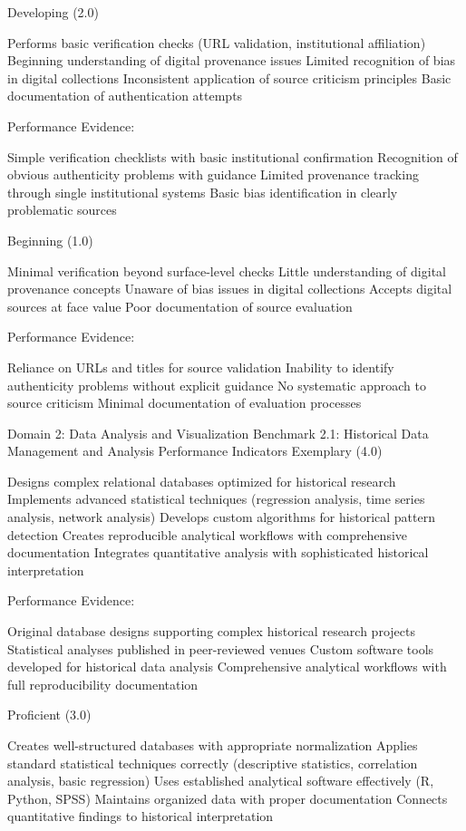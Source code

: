 \begin{appendices}
Developing (2.0)

Performs basic verification checks (URL validation, institutional affiliation)
Beginning understanding of digital provenance issues
Limited recognition of bias in digital collections
Inconsistent application of source criticism principles
Basic documentation of authentication attempts

Performance Evidence:

Simple verification checklists with basic institutional confirmation
Recognition of obvious authenticity problems with guidance
Limited provenance tracking through single institutional systems
Basic bias identification in clearly problematic sources

Beginning (1.0)

Minimal verification beyond surface-level checks
Little understanding of digital provenance concepts
Unaware of bias issues in digital collections
Accepts digital sources at face value
Poor documentation of source evaluation

Performance Evidence:

Reliance on URLs and titles for source validation
Inability to identify authenticity problems without explicit guidance
No systematic approach to source criticism
Minimal documentation of evaluation processes


Domain 2: Data Analysis and Visualization
Benchmark 2.1: Historical Data Management and Analysis
Performance Indicators
Exemplary (4.0)

Designs complex relational databases optimized for historical research
Implements advanced statistical techniques (regression analysis, time series analysis, network analysis)
Develops custom algorithms for historical pattern detection
Creates reproducible analytical workflows with comprehensive documentation
Integrates quantitative analysis with sophisticated historical interpretation

Performance Evidence:

Original database designs supporting complex historical research projects
Statistical analyses published in peer-reviewed venues
Custom software tools developed for historical data analysis
Comprehensive analytical workflows with full reproducibility documentation

Proficient (3.0)

Creates well-structured databases with appropriate normalization
Applies standard statistical techniques correctly (descriptive statistics, correlation analysis, basic regression)
Uses established analytical software effectively (R, Python, SPSS)
Maintains organized data with proper documentation
Connects quantitative findings to historical interpretation


\end{appendices}
